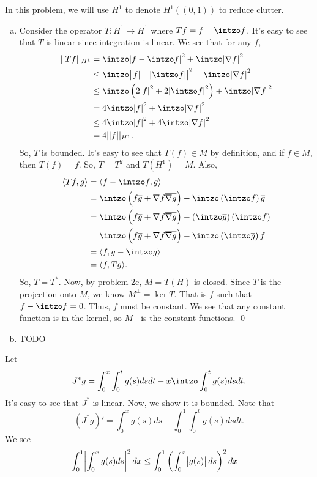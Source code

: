 \documentclass{article}
\newcommand{\D}{\nabla}
\begin{document}
\newpage
{} 
 \tri
\hop 
\solution
In this problem, we will use $H^1$ to denote $H^1((0,1))$ to reduce clutter.
\begin{enumerate}[(a)]
    \item Consider the operator $T: H^1 \to H^1$ where $Tf = f - \intzo f$. It's easy to see that $T$ is linear since integration is linear. We see that for any $f$, %
    \begin{align*}
        ||Tf||_{H^1} &= \intzo \abs{f - \intzo f}^2 + \intzo \abs{\D f}^2 \\
        &\le  \intzo \abs{\abs{f} - \abs{\intzo f}}^2 + \intzo \abs{\D f} ^2\\
        &\le  \intzo \del{2\abs{f}^2 +2 \abs{\intzo f}^2} + \intzo \abs{\D f}^2 \\
        &=  4\intzo \abs{f}^2 + \intzo \abs{\D f}^2 \\
        &\le  4\intzo \abs{f}^2 + 4\intzo \abs{\D f}^2 \\
        &= 4||f||_{H^1}.
    \end{align*}
    So, $T$ is bounded. It's easy to see that $T(f) \in M$ by definition, and if $f \in M$, then $T(f) = f$. So, $T = T^2$ and $T(H^1) = M$. Also, 
    \begin{align*}
        \ang{Tf, g} &= \ang{f-\intzo f, g } \\ 
        &= \intzo \del{f \ol{g} + \D f \ol{\D g}} - \intzo \del{\intzo f}\ol{g} \\
        &= \intzo \del{f \ol{g} + \D f \ol{\D g}} - \del{\intzo\ol{g}} \del{\intzo f} \\
        &= \intzo \del{f \ol{g} + \D f \ol{\D g}} - \intzo \del{\intzo \ol{g}}f \\
        &=\ang{f, g - \intzo g} \\
        &= \ang{f, Tg}.
    \end{align*}
    So, $T = T^*$. Now, by problem 2c, $M = T(H)$ is closed. 
    \hop 
    Since $T$ is the projection onto $M$, we know $M^\perp = \ker T$. That is $f$ such that $f - \intzo f = 0$. Thus, $f$ must be constant. We see that any constant function is in the kernel, so $M^\perp$ is the constant functions. \qed
    \item TODO
\end{enumerate}

\newpage
{} 
 \tri
\hop 
\solution
Let 
\[J^*g = \int_0^x\int_0^t g(s)dsdt - x\intzo\int_0^t g(s)ds dt. \]
It's easy to see that $J^*$ is linear. Now, we show it is bounded. Note that 
\[(J^*g)' = \int_0^x g(s) ds - \int_0^1 \int_0^t g(s)ds dt.\]
We see 
\begin{align*}
    \int_0^1 \abs{\int_0^x g(s) ds}^2dx &\le  \int_0^1\del{ \int_0^x \abs{g(s)}ds}^2 dx
\end{align*}
\end{document}
